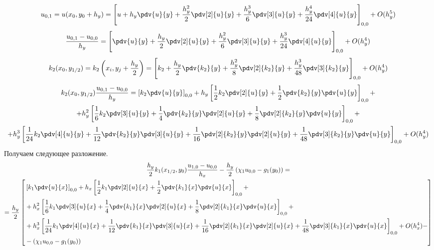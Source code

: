 \[
    u_{0,1} = u(x_{0}, y_{0} + h_y) = \left[ u + h_y \pdv{u}{y} + \frac{h_y^2}{2} \pdv[2]{u}{y} +
    \frac{h_y^3}{6} \pdv[3]{u}{y} + \frac{h_y^4}{24} \pdv[4]{u}{y} \right]_{0,0} + O(h_y^5)
\]
\[
    \frac{u_{0,1} - u_{0,0}}{h_y} = \left[ \pdv{u}{y} + \frac{h_y}{2} \pdv[2]{u}{y} +
    \frac{h_y^2}{6} \pdv[3]{u}{y} + \frac{h_y^3}{24} \pdv[4]{u}{y} \right]_{0,0} + O(h_y^4)
\]
\[
    k_2(x_{0},y_{1/2}) = k_2 \left( x_{i},y_{j} + \frac{h_y}{2} \right) = \left[
        k_2 + \frac{h_y}{2} \pdv{k_2}{y} + \frac{h_y^2}{8} \pdv[2]{k_2}{y} + \frac{h_y^3}{48} \pdv[3]{k_2}{y}
    \right]_{0,0} + O(h_y^4)
\]
\begin{multline*}
    k_2(x_{0},y_{1/2}) \frac{u_{0,1} - u_{0,0}}{h_y} = \left[ k_2 \pdv{u}{y} \right]_{0,0} +
    h_y \left[ \frac{1}{2} k_2 \pdv[2]{u}{y} + \frac{1}{2} \pdv{k_2}{y} \pdv{u}{y} \right]_{0,0} + \\
    + h_y^2 \left[ \frac{1}{6} k_2 \pdv[3]{u}{y} + \frac{1}{4} \pdv{k_2}{y} \pdv[2]{u}{y} + \frac{1}{8} \pdv[2]{k_2}{y} \pdv{u}{y} \right]_{0,0} + \\
    + h_y^3 \left[ \frac{1}{24} k_2 \pdv[4]{u}{y} + \frac{1}{12} \pdv{k_2}{y} \pdv[3]{u}{y} + \frac{1}{16} \pdv[2]{k_2}{y} \pdv[2]{u}{y} + \frac{1}{48} \pdv[3]{k_2}{y} \pdv{u}{y} \right]_{0,0} + O(h_y^4)
\end{multline*}
Получаем следующее разложение.
\begin{multline*}
    \frac{h_y}{2}  k_1(x_{1/2},y_{0}) \frac{u_{1,0} - u_{0,0}}{h_x} - \frac{h_y}{2} \left( \chi_1 u_{0,0} - g_1(y_{0}) \right) = \\
    = \frac{h_y}{2} \left[ \begin{aligned}
        & \left[ k_1 \pdv{u}{x} \right]_{0,0} +
        h_x \left[ \frac{1}{2} k_1 \pdv[2]{u}{x} + \frac{1}{2} \pdv{k_1}{x} \pdv{u}{x} \right]_{0,0} + \\
        & + h_x^2 \left[ \frac{1}{6} k_1 \pdv[3]{u}{x} + \frac{1}{4} \pdv{k_1}{x} \pdv[2]{u}{x} + \frac{1}{8} \pdv[2]{k_1}{x} \pdv{u}{x} \right]_{0,0} + \\
        & + h_x^3 \left[ \frac{1}{24} k_1 \pdv[4]{u}{x} + \frac{1}{12} \pdv{k_1}{x} \pdv[3]{u}{x} + \frac{1}{16} \pdv[2]{k_1}{x} \pdv[2]{u}{x} + \frac{1}{48} \pdv[3]{k_1}{x} \pdv{u}{x} \right]_{0,0} + O(h_x^4) - \\
        & - \left( \chi_1 u_{0,0} - g_1(y_{0}) \right)
    \end{aligned} \right]
\end{multline*}
